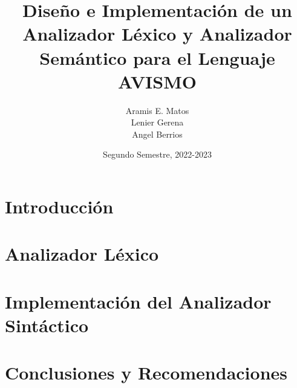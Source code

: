 \documentclass[12pt]{report}
\title{Diseño e Implementación de un Analizador Léxico y Analizador Semántico para el Lenguaje AVISMO}
\author{Aramis E. Matos \\ Lenier Gerena \\ Angel Berrios}
\date{Segundo Semestre, 2022-2023}
\begin{document}
\renewcommand{\acronymname}{Acrónimos}
\renewcommand{\bibname}{Referencias Bibliográficas}
\renewcommand{\contentsname}{Tabla de Contenido}
\renewcommand{\chaptername}{Capítulo}
\renewcommand{\figurename}{Figura}
\renewcommand{\tablename}{Tabla}

\maketitle
\tableofcontents

\chapter{Introducción}



\chapter{Analizador Léxico}



\chapter{Implementación del Analizador Sintáctico}



\chapter{Conclusiones y Recomendaciones}







\printglossary[type=\acronymtype]
\end{document}
